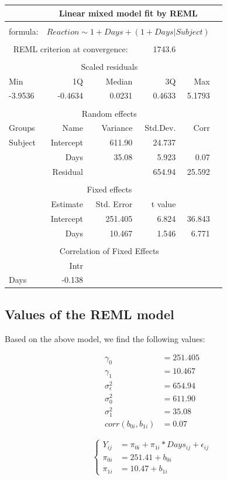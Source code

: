 \documentclass[
]{article}
\begin{document}
\begin{longtable}[]{@{}lrrrrr@{}}
\toprule
& \multicolumn{4}{c}{Linear mixed model fit by REML} \tabularnewline
\midrule
\tabularnewline
formula: & \multicolumn{4}{c}{$Reaction \sim 1 + Days + (1 + Days | Subject)$} \tabularnewline
\tabularnewline
\multicolumn{3}{c}{REML criterion at convergence:} & 1743.6 \tabularnewline
\tabularnewline
\multicolumn{5}{c}{Scaled residuals}\tabularnewline
\midrule
Min & 1Q & Median & 3Q & Max \tabularnewline
\midrule
-3.9536 & -0.4634 & 0.0231 & 0.4633 & 5.1793 \tabularnewline
\midrule
\tabularnewline
\multicolumn{5}{c}{Random effects}\tabularnewline
\midrule
Groups & Name & Variance & Std.Dev. & Corr \tabularnewline
\midrule
Subject & Intercept & 611.90 & 24.737 &        \tabularnewline
        & Days      & 35.08  & 5.923  & 0.07   \tabularnewline
        & Residual  &        & 654.94 & 25.592 \tabularnewline
\midrule
\tabularnewline
\multicolumn{5}{c}{Fixed effects}\tabularnewline
\midrule
        & Estimate  & Std. Error & t value &  \tabularnewline
\midrule
   & Intercept & 251.405 & 6.824 &  36.843 \tabularnewline
   & Days      & 10.467  & 1.546 & 6.771   \tabularnewline
\midrule
\tabularnewline
\multicolumn{5}{c}{Correlation of Fixed Effects}\tabularnewline
\midrule
& Intr \tabularnewline
\midrule
Days & -0.138 \tabularnewline
\bottomrule
\end{longtable}

\newpage 


\hypertarget{values-of-the-reml-model}{%
\subsection{Values of the REML model}\label{values-of-the-reml-model}}

Based on the above model, we find the following values:

\[\begin{aligned}
\gamma_{0}  &= 251.405 \\
\gamma_{1}  &= 10.467  \\
\sigma_{\epsilon}^{2} &= 654.94 \\
\sigma_{0}^{2} &= 611.90 \\
\sigma_{1}^{2} &= 35.08 \\
corr(b_{0i}, b_{1i}) &= 0.07
\end{aligned} \tag{9}\]

\[
\begin{cases}
Y_{ij}   &= \pi_{0i} + \pi_{1i}* Days_{ij} + \epsilon_{ij} \\
\pi_{0i} &= 251.41 + b_{0i} \\
\pi_{1i} &= 10.47 + b_{1i}
\end{cases} \tag{10}
\]
\end{document}
